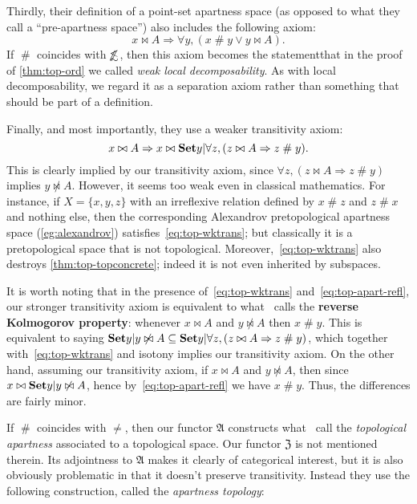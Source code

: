 \documentclass{article}
\def\apart{\mathrel{\#}}
\def\oapt{\mathrel{\!\not\,\not\lesssim}}
\let\implies\Rightarrow
\def\anti{\mathfrak{A}}
\def\neigh{\mathfrak{Z}}
\begin{document}
Thirdly, their definition of a point-set apartness space (as opposed to what they call a ``pre-apartness space'') also includes the following axiom:
\[ x\bowtie A \implies \forall y, (x\apart y \lor y\bowtie A). \]
If $\apart$ coincides with $\oapt$, then this axiom becomes the statementthat in the proof of \cref{thm:top-ord} we called \emph{weak local decomposability}.
As with local decomposability, we regard it as a separation axiom rather than something that should be part of a definition.

Finally, and most importantly, they use a weaker transitivity axiom:
\begin{equation}
  x\bowtie A \implies x \bowtie \setof{ y | \forall z, (z\bowtie A \implies z\apart y)}.\label{eq:top-wktrans}
\end{equation}
This is clearly implied by our transitivity axiom, since $\forall z, (z\bowtie A \implies z\apart y)$ implies $y\not\bowtie A$.
However, it seems too weak even in classical mathematics.
For instance, if $X = \{x,y,z\}$ with an irreflexive relation defined by $x\apart z$ and $z\apart x$ and nothing else, then the corresponding Alexandrov pretopological apartness space (\cref{eg:alexandrov}) satisfies~\eqref{eq:top-wktrans}; but classically it is a pretopological space that is not topological.
Moreover,~\eqref{eq:top-wktrans} also destroys \cref{thm:top-topconcrete}; indeed it is not even inherited by subspaces.

It is worth noting that in the presence of~\eqref{eq:top-wktrans} and~\eqref{eq:top-apart-refl}, our stronger transitivity axiom is equivalent to what~\cite{bridges-vita} calls the \textbf{reverse Kolmogorov property}: whenever $x\bowtie A$ and $y\not\bowtie A$ then $x\apart y$.
This is equivalent to saying $\setof{y|y\not\bowtie A} \subseteq \setof{ y | \forall z, (z\bowtie A \implies z\apart y)}$, which together with~\eqref{eq:top-wktrans} and isotony implies our transitivity axiom.
On the other hand, assuming our transitivity axiom, if $x\bowtie A$ and $y\not\bowtie A$, then since $x\bowtie \setof{y|y\not\bowtie A}$, hence by~\eqref{eq:top-apart-refl} we have $x\apart y$.
Thus, the differences are fairly minor.

If $\apart$ coincides with $\neq$, then our functor $\anti$ constructs what~\cite{bridges-vita} call the \emph{topological apartness} associated to a topological space.
Our functor $\neigh$ is not mentioned therein.
Its adjointness to $\anti$ makes it clearly of categorical interest, but it is also obviously problematic in that it doesn't preserve transitivity.
Instead they use the following construction, called the \emph{apartness topology}:
\end{document}
